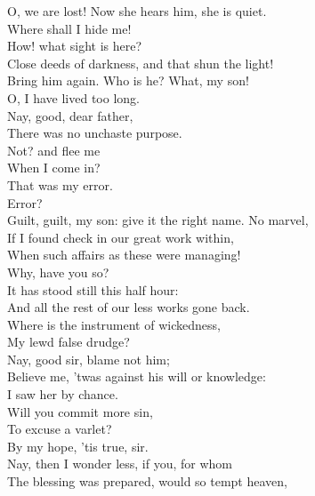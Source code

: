 \documentclass{memoir}
\begin{document}
\begin{drama*}
\facespeaks {} O, we are lost! Now she hears him, she is quiet.\\
\mammonspeaks  Where shall I hide me!\\
\subtlespeaks {} How! what sight is here?\\
 Close deeds of darkness, and that shun the light!\\
 Bring him again. Who is he? What, my son!\\
 O, I have lived too long.\\
\mammonspeaks {} Nay, good, dear father,\\
 There was no unchaste purpose.\\
\subtlespeaks {} Not? and flee me\\
 When I come in?\\
\mammonspeaks {} That was my error.\\
\subtlespeaks {} Error?\\
 Guilt, guilt, my son: give it the right name. No marvel,\\
 If I found check in our great work within,\\
 When such affairs as these were managing!\\
\mammonspeaks  Why, have you so?\\
\subtlespeaks {} It has stood still this half hour:\\
 And all the rest of our less works gone back.\\
 Where is the instrument of wickedness,\\
 My lewd false drudge?\\
\mammonspeaks {} Nay, good sir, blame not him;\\
 Believe me, 'twas against his will or knowledge:\\
 I saw her by chance.\\
\subtlespeaks {} Will you commit more sin,\\
 To excuse a varlet?\\
\mammonspeaks {} By my hope, 'tis true, sir.\\
\subtlespeaks  Nay, then I wonder less, if you, for whom\\
 The blessing was prepared, would so tempt heaven,\\

\end{drama*}
\end{document}
